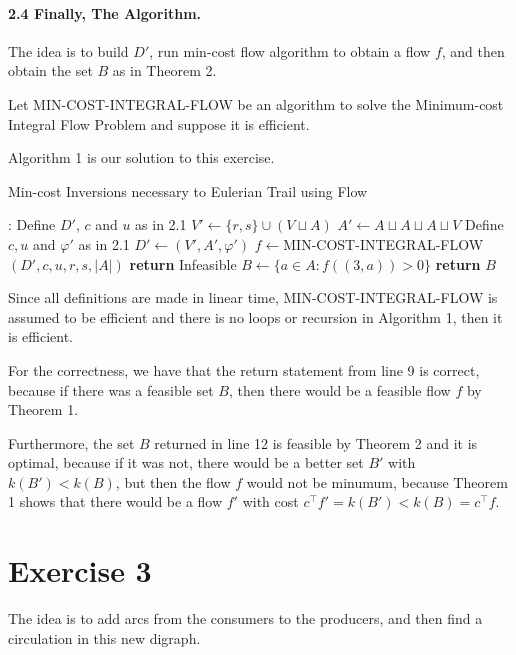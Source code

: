 \documentclass[a4paper,10pt, leqno]{article}
\theoremstyle{definition}
\def\blankpage{%
      \null%
      \clearpage}
\begin{document}
\paragraph{\textbf{2.4 Finally, The Algorithm.}} 

The idea is to build $D'$, run min-cost flow algorithm to obtain a flow $f$, and then obtain the set $B$ as in Theorem 2.  

Let MIN-COST-INTEGRAL-FLOW be an algorithm to solve the Minimum-cost Integral Flow Problem and suppose it is efficient. 

Algorithm 1 is our solution to this exercise.

\begin{algorithm}{}
\begin{algorithmic}[1]
\caption{Min-cost Inversions necessary to Eulerian Trail using Flow}
:
\State \Comment Define $D'$, $c$ and $u$ as in 2.1
\State $V' \gets \{r, s\} \cup (V \sqcup A)$
\State $A' \gets A \sqcup A \sqcup A\sqcup V$
\State Define $c, u$ and $\varphi'$ as in 2.1
\State $D' \gets (V', A', \varphi')$
\State $f \gets $MIN-COST-INTEGRAL-FLOW$(D', c, u, r, s, |A|)$
\State \textbf{return} Infeasible
\Else
\State $B \gets \{a \in A : f((3, a)) > 0\}$
\State \textbf{return} $B$
\EndIf
\EndProcedure
\end{algorithmic}
\end{algorithm}

Since all definitions are made in linear time, MIN-COST-INTEGRAL-FLOW is assumed to be efficient and there is no loops or recursion in Algorithm 1, then it is efficient.

For the correctness, we have that the return statement from line 9 is correct, because if there was a feasible set $B$, then there would be a feasible flow $f$ by Theorem 1.

Furthermore, the set $B$ returned in line 12 is feasible by Theorem 2 and it is optimal, because if it was not, there would be a better set $B'$ with $k(B') < k(B)$, but then the flow $f$ would not be minumum, because Theorem 1 shows that there would be a flow $f'$ with cost $c^\intercal f' = k(B') < k(B) = c^\intercal f$.

\blankpage

\section*{Exercise 3}

The idea is to add arcs from the consumers to the producers, and then find a circulation in this new digraph.
\end{document}

